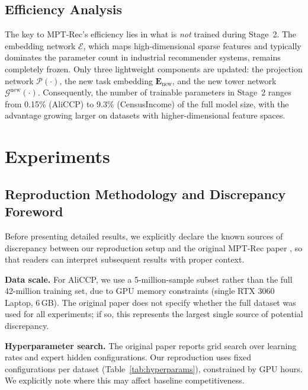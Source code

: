 \documentclass[review,anonymous]{acmart}
\begin{document}
\subsection{Efficiency Analysis}

The key to MPT-Rec's efficiency lies in what is \emph{not} trained during
Stage~2. The embedding network $\mathcal{E}$, which maps high-dimensional sparse
features and typically dominates the parameter count in industrial recommender
systems, remains completely frozen. Only three lightweight components are
updated: the projection network $\mathcal{P}(\cdot)$, the new task embedding
$\mathbf{E}_{\text{new}}$, and the new tower network $\mathcal{G}^{\text{new}}(\cdot)$.
Consequently, the number of trainable parameters in Stage~2 ranges from 0.15\%
(AliCCP) to 9.3\% (CensusIncome) of the full model size, with the advantage
growing larger on datasets with higher-dimensional feature spaces.

\section{Experiments}
\label{sec:experiments}

\subsection{Reproduction Methodology and Discrepancy Foreword}

Before presenting detailed results, we explicitly declare the known sources of
discrepancy between our reproduction setup and the original MPT-Rec paper
\cite{bai2025efficient}, so that readers can interpret subsequent results with
proper context.

\textbf{Data scale.} For AliCCP, we use a 5-million-sample subset rather than
the full 42-million training set, due to GPU memory constraints (single RTX 3060 Laptop, 6\,GB). The original paper does not specify whether the full dataset was
used for all experiments; if so, this represents the largest single source of
potential discrepancy.

\textbf{Hyperparameter search.} The original paper reports grid search over
learning rates and expert hidden configurations. Our reproduction uses fixed
configurations per dataset (Table~\ref{tab:hyperparams}), constrained by GPU
hours. We explicitly note where this may affect baseline competitiveness.
\end{document}
